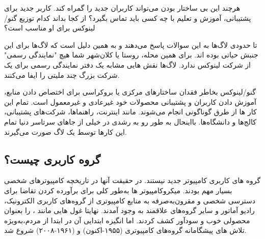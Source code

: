 هرچند این بی ساختار بودن می‌تواند کاربران جدید را گمراه کند. کاربر جدید برای پشتیبانی، آموزش و تعلیم با چه کسی باید تماس بگیرد؟ از کجا بداند کدام توزیع گنو/لینوکس برای او مناسب است؟

تا حدودی لاگ‌ها به این سوالات پاسخ می‌دهند و به همین دلیل است که لاگ‌ها برای این جنبش حیاتی بوده اند. برای همین محله، روستا یا کلان‌شهر شما هیچ "نمایندگی رسمی" از شرکت لینوکس ندارد. لاگ‌ها نقش هایی مشابه یک دفتر نمایندگی رسمی برای یک شرکت بزرگ چند ملیتی را ایفا می‌کنند.

گنو/لینوکس بخاطر فقدان ساختار‌های مرکزی یا بروکراسی برای اختصاص دادن منابع،
آموزش دادن کاربران و پشتیبانی محصولات خود غیرعادی و غیرمعمول است. تمام این کار ها
از طرق گوناگونی انجام می‌شوند. مانند اینترنت، راهنماها،
شرکت‌های پشتیبانی، کالج‌ها و دانشگاه‌ها. بااینحال به طور رو به رشدی در خیلی از جاهای
سرتاسر دنیا تمام این کارها توسط یک لاگ صورت می‌گیرند.

\subsection{گروه کاربری چیست؟}

گروه های کاربری کامپیوتر جدید نیستند. در حقیقت آنها در تاریخچه کامپیوترهای شخصی
بسیار مهم بودند. میکروکامپیوتر ها به‌طور کلی برای برآورده کردن تقاضا برای دسترسی شخصی
و مقرون‌به‌صرفه به منابع کامپیوتری از گروه‌های کاربری الکترونیک، رادیو آماتور و سایر گروه‌های
علاقمند به وجود آمدند. نهایتا غول هایی مانند ،  را بعنوان محصولی خوب و سودآور
کشف کردند. اما انگیزه ابتدایی آن در ابتدا از مردم،‌به‌ویژه تلاش های پیشگامانه
گروه‌های کامپیوتری  (۱۹۵۵-اکنون) و  (۱۹۶۱-۲۰۰۸) شروع شد.

